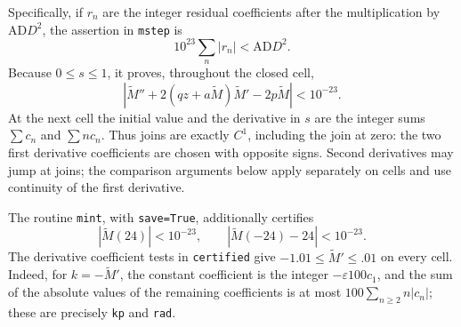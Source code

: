 \documentclass[11pt,a4paper]{article}
\numberwithin{equation}{section}
\theoremstyle{definition}
\theoremstyle{remark}
\begin{document}
Specifically, if $r_n$ are the integer residual coefficients after the
multiplication by $\mathrm{AD}D^2$, the assertion in \texttt{mstep} is
\[
 10^{23}\sum_n|r_n|<\mathrm{AD}D^2.
\]
Because $0\le s\le1$, it proves, throughout the closed cell,
\begin{equation}\label{cert:M-residual}
 |\widetilde M''+2(qz+a\widetilde M)\widetilde M'-2p\widetilde M|
 <10^{-23}.
\end{equation}
At the next cell the initial value and the derivative in $s$ are the integer
sums $\sum c_n$ and $\sum nc_n$.  Thus joins are exactly $C^1$, including the
join at zero: the two first derivative coefficients are chosen with opposite
signs.  Second derivatives may jump at joins; the comparison arguments below
apply separately on cells and use continuity of the first derivative.

The routine \texttt{mint}, with \texttt{save=True}, additionally certifies
\begin{equation}\label{cert:M-boundary}
 |\widetilde M(24)|<10^{-23},\qquad
 |\widetilde M(-24)-24|<10^{-23}.
\end{equation}
The derivative coefficient tests in \texttt{certified} give
$-1.01\le\widetilde M'\le .01$ on every cell.  Indeed, for
$k=-\widetilde M'$, the constant coefficient is the integer
$-\varepsilon100c_1$, and the sum of the absolute values of the remaining
coefficients is at most $100\sum_{n\ge2}n|c_n|$; these are precisely
\texttt{kp} and \texttt{rad}.
\end{document}
